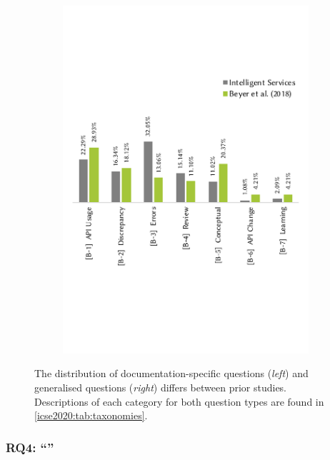 \begin{figure}[h]
  \hfill
  \begin{subfigure}[c]{0.49\linewidth}
    \centering
    \includegraphics[width=\linewidth]{mainmatter/publications/figures/icse2020/b-compare.pdf}
  \end{subfigure}
    \centering
    \caption[Distribution of issues on Stack Overflow]{The distribution of documentation-specific questions (\textit{left}) and generalised questions (\textit{right}) differs between prior studies. Descriptions of each category for both question types are found in \cref{icse2020:tab:taxonomies}.}
    \label{fig:conclusion:question-diff}
\end{figure}

\subsubsection[Answering RQ4]{RQ4: ``\RQFourDesign{}''}

